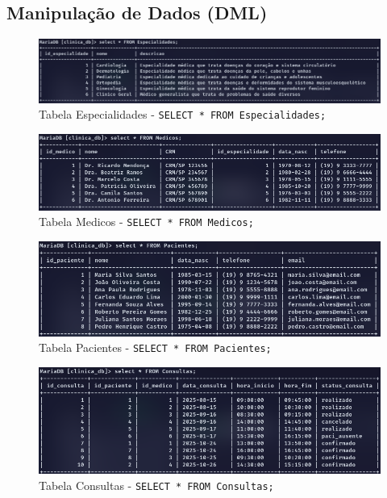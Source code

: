 \subsection{Manipulação de Dados (DML)}\label{subsec: DML}

\begin{figure}[H]
    \centering
    \includegraphics[width=1\linewidth]{Text/DML/Especialidades.png}
    \caption{Tabela Especialidades - \texttt{SELECT * FROM Especialidades;}}
    \label{fig:Especialidades}
\end{figure}

\begin{figure}[H]
    \centering
    \includegraphics[width=1\linewidth]{Text/DML/Medicos.png}
    \caption{Tabela Medicos - \texttt{SELECT * FROM Medicos;}}
    \label{fig:Medicos}
\end{figure}

\begin{figure}[H]
    \centering
    \includegraphics[width=1\linewidth]{Text/DML/Pacientes.png}
    \caption{Tabela Pacientes - \texttt{SELECT * FROM Pacientes;}}
    \label{fig:Pacientes}
\end{figure}

\begin{figure}[H]
    \centering
    \includegraphics[width=1\linewidth]{Text/DML/Consultas.png}
    \caption{Tabela Consultas - \texttt{SELECT * FROM Consultas;}}
    \label{fig:Especialdiades}
\end{figure}

